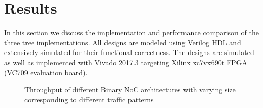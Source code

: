 \section{Results}
\label{sec:result}

In this section we discuss the implementation and performance comparison of the three tree implementations.
All designs are modeled using Verilog HDL and extensively simulated for their functional correctness.
The designs are simulated as well as implemented with Vivado 2017.3 targeting Xilinx xc7vx690t FPGA (VC709 evaluation board).

\begin{figure}[t]
\centering    %
{}
\vspace{-3mm}
\caption{Throughput of different Binary NoC architectures with varying size corresponding to different traffic patterns}
\label{fig:tput}
\vspace{-5mm}
\end{figure}

